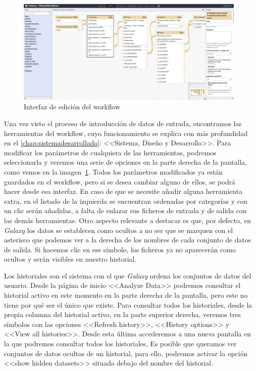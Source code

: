 \begin{figure}
    \begin{center}
      \includegraphics[scale=0.3]{images/InterfazWorkflowEdit.png}
      \caption{Interfaz de edición del workflow}
      \label{fig:WorkflowEdit}
    \end{center}
\end{figure}
Una vez visto el proceso de introducción de datos de entrada, encontramos las herramientas del workflow, cuyo funcionamiento se explica con más profundidad en el \autoref{chap:sistemadesarrollado}: <<Sistema, Diseño y Desarrollo>>. Para modificar los parámetros de cualquiera de las herramientas, podremos seleccionarla y veremos una serie de opciones en la parte derecha de la pantalla, como vemos en la imagen~\ref{fig:WorkflowEdit}. Todos los parámetros modificados ya están guardados en el workflow, pero si se desea cambiar alguno de ellos, se podrá hacer desde esa interfaz. En caso de que se necesite añadir alguna herramienta extra, en el listado de la izquierda se encuentran ordenadas por categorías y con un clic serán añadidas, a falta de enlazar sus ficheros de entrada y de salida con las demás herramientas. Otro aspecto relevante a destacar es que, por defecto, en \textit{Galaxy} los datos se establecen como ocultos a no ser que se marquen con el asterisco que podemos ver a la derecha de los nombres de cada conjunto de datos de salida. Si hacemos clic en ese símbolo, los ficheros ya no aparecerán como ocultos y serán visibles en nuestro historial.

Los historiales son el sistema con el que \textit{Galaxy} ordena los conjuntos de datos del usuario. Desde la página de inicio <<Analyze Data>> podremos consultar el historial activo en este momento  en la parte derecha de la pantalla, pero este no tiene por qué ser el único que existe. Para consultar todos los historiales, desde la propia columna del historial activo, en la parte superior derecha, veremos tres símbolos con las opciones <<Refresh history>>, <<History options>> y <<View all histories>>. Desde esta última accederemos a una nueva pantalla en la que podremos consultar todos los historiales, Es posible que queramos ver conjuntos de datos ocultos de un historial, para ello, podremos activar la opción <<show hidden datasets>> situada debajo del nombre del historial.

